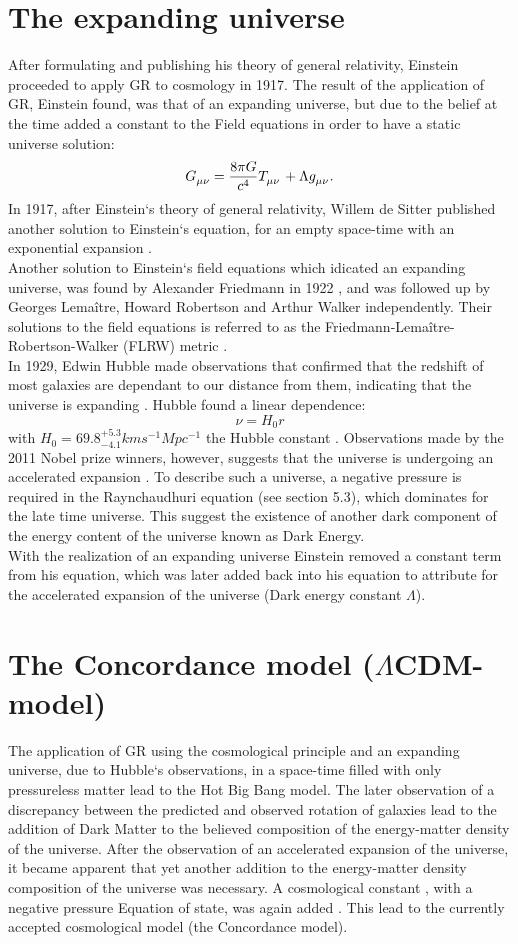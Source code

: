 \documentclass[a4paper, 11pt]{FSKH_623_Report}
\numberwithin{equation}{section}
\begin{document}
\section{The expanding universe}
After formulating and publishing his theory of general relativity, Einstein proceeded to apply GR to cosmology in 1917. The result of the application of GR, Einstein found, was that of an expanding universe, but due to the belief at the time added a constant to the Field equations in order to have a static universe solution: $$\tensor{G}{_{\mu\nu}}=\frac{8\pi G}{c^{4}}\tensor{T}{_{\mu\nu}}+\Lambda\tensor{g}{_{\mu\nu}}.$$ In 1917, after Einstein`s theory of general relativity, Willem de Sitter published another solution to Einstein`s equation, for an empty space-time with an exponential expansion \citep{ITC, NPSNe}.\\
Another solution to Einstein`s field equations which idicated an expanding universe, was found by Alexander Friedmann in 1922 \citep{Friedman1922}, and was followed up by Georges Lema\^itre, Howard Robertson and Arthur Walker independently. Their solutions to the field equations is referred to as the Friedmann-Lemaître-Robertson-Walker (FLRW) metric \citep{GRFD}.\\
In 1929, Edwin Hubble made observations that confirmed that the redshift of most galaxies are dependant to our distance from them, indicating that the universe is expanding \citep{GRFD}. Hubble found a linear dependence: $$\nu=H_{0}r$$ with $H_{0}=69.8^{+5.3}_{-4.1}km s^{-1}Mpc^{-1}$ the Hubble constant \citep{HPValue}. Observations made by the 2011 Nobel prize winners, however, suggests that the universe is undergoing an accelerated expansion \citep{NPSNe}.
To describe such a universe, a negative pressure is required in the Raynchaudhuri equation (see section 5.3), which dominates for the late time universe. This suggest the existence of another dark component of the energy content of the universe known as Dark Energy.\\
With the realization of an expanding universe Einstein removed a constant term from his equation, which was later added back into his equation to attribute for the accelerated expansion of the universe (Dark energy constant $\Lambda$).
\section{The Concordance model ($\Lambda$CDM-model)}
The application of GR using the cosmological principle and an expanding universe, due to Hubble`s observations, in a space-time filled with only pressureless matter lead to the Hot Big Bang model. The later observation of a discrepancy between the  predicted and observed rotation of galaxies lead to the addition of Dark Matter to the believed composition of the energy-matter density of the universe. After the observation of an accelerated expansion of the universe, it became apparent that yet another addition to the energy-matter density composition of the universe was necessary. A cosmological constant , with a negative pressure Equation of state, was again added \citep{GRFD}. This lead to the currently accepted cosmological model (the Concordance model).
\end{document}
